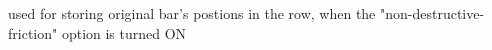 %
%


\section{}\label{cbbarshapedata}


used for storing original bar's postions in the row, when the "non-destructive-friction"
option is turned ON




